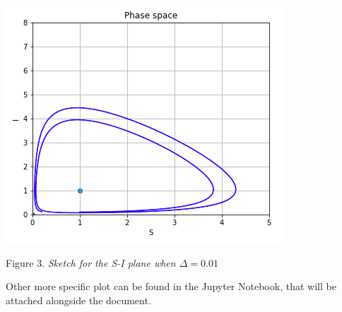 \documentclass[../main.tex]{subfiles}
\begin{document}
    \begin{center}
        \includegraphics[scale=.5]{images/false_image_2.png}
        
        Figure 3. \textit{Sketch for the S-I plane when $\Delta = 0.01$}
    \end{center}
    
    Other more specific plot can be found in the Jupyter Notebook, that will be attached alongside the document.
\end{document}
